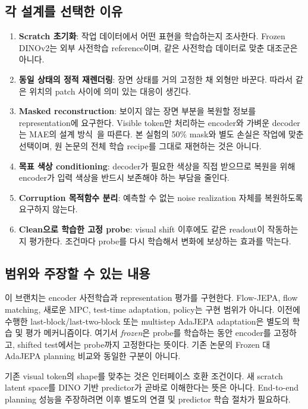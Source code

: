 \documentclass[11pt,a4paper]{article}
\begin{document}
\subsection{각 설계를 선택한 이유}
\begin{enumerate}
\item \textbf{Scratch 초기화}: 작업 데이터에서 어떤 표현을 학습하는지 조사한다.
Frozen DINOv2는 외부 사전학습 reference이며, 같은 사전학습 데이터로 맞춘 대조군은 아니다.
\item \textbf{동일 상태의 정적 재렌더링}: 장면 상태를 거의 고정한 채 외형만 바꾼다.
따라서 같은 위치의 patch 사이에 의미 있는 대응이 생긴다.
\item \textbf{Masked reconstruction}: 보이지 않는 장면 부분을 복원할 정보를
representation에 요구한다. Visible token만 처리하는 encoder와 가벼운 decoder는
MAE의 설계 방식~\cite{mae}을 따른다. 본 실험의 50\% mask와 별도 손실은 작업에
맞춘 선택이며, 원 논문의 전체 학습 recipe를 그대로 재현하는 것은 아니다.
\item \textbf{목표 색상 conditioning}: decoder가 필요한 색상을 직접 받으므로
복원을 위해 encoder가 입력 색상을 반드시 보존해야 하는 부담을 줄인다.
\item \textbf{Corruption 목적함수 분리}: 예측할 수 없는 noise realization 자체를
복원하도록 요구하지 않는다.
\item \textbf{Clean으로 학습한 고정 probe}: visual shift 이후에도 같은 readout이
작동하는지 평가한다. 조건마다 probe를 다시 학습해서 변화에 보상하는 효과를 막는다.
\end{enumerate}

\subsection{범위와 주장할 수 있는 내용}
이 브랜치는 encoder 사전학습과 representation 평가를 구현한다. Flow-JEPA,
flow matching, 새로운 MPC, test-time adaptation, policy는 구현 범위가 아니다.
이전에 수행한 last-block/last-two-block 또는 multistep AdaJEPA adaptation은
별도의 학습 및 평가 메커니즘이다. 여기서 \emph{frozen}은 probe를 학습하는 동안
encoder를 고정하고, shifted test에서는 probe까지 고정한다는 뜻이다.
기존 논문의 Frozen 대 AdaJEPA planning 비교와 동일한 구분이 아니다.

기존 visual token의 shape를 맞추는 것은 인터페이스 호환 조건이다. 새 scratch
latent space를 DINO 기반 predictor가 곧바로 이해한다는 뜻은 아니다.
End-to-end planning 성능을 주장하려면 이후 별도의 연결 및 predictor 학습 절차가 필요하다.
\end{document}
